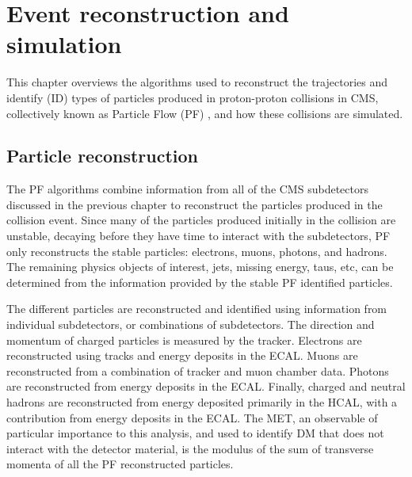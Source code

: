 \chapter{Event reconstruction and simulation}

This chapter overviews the algorithms used to reconstruct the trajectories and identify (ID) types of particles produced in proton-proton collisions in CMS, collectively known as Particle Flow (PF) \cite{CMS:2009nxa}, and how these collisions are simulated.

\section{Particle reconstruction}

The PF algorithms combine information from all of the CMS subdetectors discussed in the previous chapter to reconstruct the particles produced in the collision event. Since many of the particles produced initially in the collision are unstable, decaying before they have time to interact with the subdetectors, PF only reconstructs the stable particles: electrons, muons, photons, and hadrons. The remaining physics objects of interest, jets, missing energy, taus, etc, can be determined from the information provided by the stable PF identified particles. 

\indent The different particles are reconstructed and identified using information from individual subdetectors, or combinations of subdetectors. The direction and momentum of charged particles is measured by the tracker. Electrons are reconstructed using tracks and energy deposits in the ECAL. Muons are reconstructed from a combination of tracker and muon chamber data. Photons are reconstructed from energy deposits in the ECAL. Finally, charged and neutral hadrons are reconstructed from energy deposited primarily in the HCAL, with a contribution from energy deposits in the ECAL. The MET, an observable of particular importance to this analysis, and used to identify DM that does not interact with the detector material, is the modulus of the sum of transverse momenta of all the PF reconstructed particles. 

